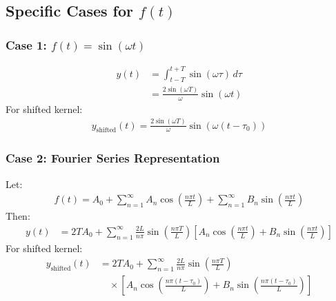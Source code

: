 \documentclass{article}
\begin{document}
\subsection*{Specific Cases for $f(t)$}
\subsubsection*{Case 1: $f(t) = \sin(\omega t)$}
\begin{align*}
y(t) &= \int_{t - T}^{t + T} \sin(\omega \tau) \,d\tau \\
     &= \frac{2 \sin(\omega T)}{\omega} \sin(\omega t)
\end{align*}
For shifted kernel:
\begin{align*}
y_{\text{shifted}}(t) = \frac{2 \sin(\omega T)}{\omega} \sin(\omega (t - \tau_0))
\end{align*}

\subsubsection*{Case 2: Fourier Series Representation}
Let:
\begin{align*}
f(t) = A_0 + \sum_{n=1}^\infty A_n \cos\left(\frac{n\pi t}{L}\right) + \sum_{n=1}^\infty B_n \sin\left(\frac{n\pi t}{L}\right)
\end{align*}
Then:
\begin{align*}
y(t) &= 2 T A_0 + \sum_{n=1}^\infty \frac{2 L}{n \pi} \sin\left(\frac{n \pi T}{L}\right) \left[ A_n \cos\left(\frac{n \pi t}{L}\right) + B_n \sin\left(\frac{n \pi t}{L}\right) \right]
\end{align*}
For shifted kernel:
\begin{align*}
y_{\text{shifted}}(t) &= 2 T A_0 + \sum_{n=1}^\infty \frac{2 L}{n \pi} \sin\left(\frac{n \pi T}{L}\right) \\
&\quad \times \left[ A_n \cos\left(\frac{n \pi (t - \tau_0)}{L}\right) + B_n \sin\left(\frac{n \pi (t - \tau_0)}{L}\right) \right]
\end{align*}
\end{document}
